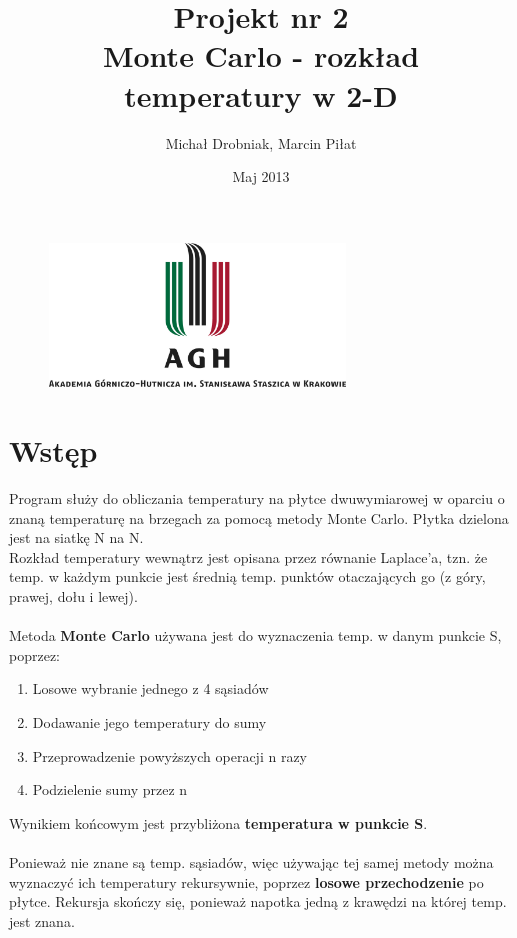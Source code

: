\documentclass[11pt,a4paper]{article}
\begin{document}
\title{\LARGE  Projekt nr 2 \\ \vspace{0.4cm} \textbf{Monte Carlo - rozkład temperatury w 2-D}}
\author{Michał Drobniak, 
 Marcin Piłat }
\date{Maj 2013}
\maketitle

\vfill
\begin{figure}[H]
\begin{center}
\includegraphics[width=0.7\textwidth]{agh_nzw_s_pl_1w_wbr_rgb_150ppi.jpg}
\end{center}
\end{figure}
\newpage

\section{Wstęp}

Program służy do obliczania temperatury na płytce dwuwymiarowej w oparciu o znaną temperaturę na brzegach za pomocą metody Monte Carlo. Płytka dzielona jest na siatkę N na N.\\
Rozkład temperatury wewnątrz jest opisana przez równanie Laplace'a, tzn. że temp. w każdym punkcie jest średnią temp. punktów otaczających go (z góry, prawej, dołu i lewej).\\
\\
Metoda \textbf{Monte Carlo} używana jest do wyznaczenia temp. w danym punkcie S, poprzez:
\begin{enumerate}
	\item Losowe wybranie jednego z 4 sąsiadów
	\item Dodawanie jego temperatury do sumy
	\item Przeprowadzenie powyższych operacji n razy
	\item Podzielenie sumy przez n
\end{enumerate}
Wynikiem końcowym jest przybliżona \textbf{temperatura w punkcie S}.\\
\\
Ponieważ nie znane są temp. sąsiadów, więc używając tej samej metody można wyznaczyć ich temperatury rekursywnie, poprzez \textbf{losowe przechodzenie} po płytce. Rekursja skończy się, ponieważ napotka jedną z krawędzi na której temp. jest znana.
\end{document}
